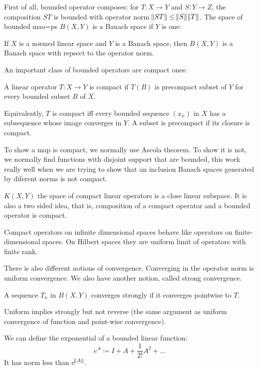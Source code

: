 \documentclass[main.tex]{subfiles}
\begin{document}
First of all, bounded operator composes: for $T: X \rightarrow Y$ and $S: Y \rightarrow Z$, the composition $ST$ is bounded with operator norm $\norm{ST} \leq \norm{S}\norm{T}$. 
The space of bounded mao=ps $B(X,Y)$ is a Banach space if $Y$ is one:
\begin{theorem}
If $X$ is a normed linear space and $Y$ is a Banach space, then $B(X,Y)$ is a Banach space with repsect to the operator norm.
\end{theorem}

An important class of bounded operators are compact ones:

\begin{definition}
A linear operator $T: X \rightarrow Y$ is compact if $T(B)$ is precompact subset of $Y$ for every bounded subset $B$ of $X$.
\end{definition}

Equivalently, $T$ is compact iff every bounded sequence $(x_n)$ in $X$ has a subsequence whose image converges in $Y$. A subset is precompact if its closure is compact. 

To show a map is compact, we normally use Ascola theorem. To show it is not, we normally find functions with disjoint support that are bounded, this work really well when we are trying to show that an inclusion Banach spaces generated by diferent norms is not compact.

\begin{proposition}
$K(X,Y)$ the space of compact linear operators is a close linear subspace. It is also a two sided idea, that is, composition of a compact operator and a bounded operator is compact.
\end{proposition}

Compact operators on infinite dimensional spaces behave like operators on finite-dimensional spaces. On Hilbert spaces they are uniform limit of operators with finite rank.

There is also different notions of convergence. Converging in the operator norm is uniform convergence. We also have another notion, called strong convergence.

\begin{definition}
A sequence $T_n$ in $B(X,Y)$ converges strongly if it converges pointwise to $T$.
\end{definition}
Uniform implies strongly but not reverse (the same argument as uniform convergence of function and point-wise convergence).

We can define the exponential of a bounded linear function:
$$
e^A \coloneqq I + A + \frac{1}{2!}A^2 + ...
$$
It has norm less than $e^{\norm{A}}$.
\end{document}
